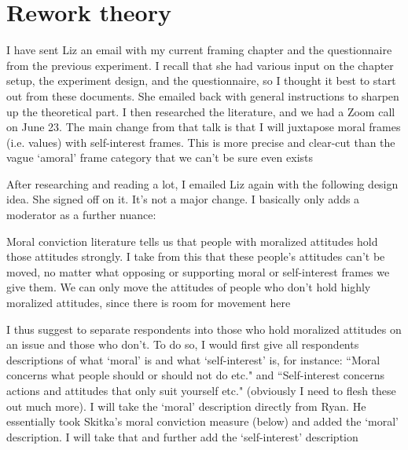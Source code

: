 \section*{Rework theory}
	\begin{coi}
		\item I have sent Liz an email with my current framing chapter and the questionnaire from the previous experiment. I recall that she had various input on the chapter setup, the experiment design, and the questionnaire, so I thought it best to start out from these documents. She emailed back with general instructions to sharpen up the theoretical part. I then researched the literature, and we had a Zoom call on June 23. The main change from that talk is that I will juxtapose moral frames (i.e. values) with self-interest frames. This is more precise and clear-cut than the vague `amoral' frame category that we can't be sure even exists
		\item After researching and reading a lot, I emailed Liz again with the following design idea. She signed off on it. It's not a major change. I basically only adds a moderator as a further nuance:
			\begin{coi}
				\item Moral conviction literature tells us that people with moralized attitudes hold those attitudes strongly. I take from this that these people's attitudes can't be moved, no matter what opposing or supporting moral or self-interest frames we give them. We can only move the attitudes of people who don't hold highly moralized attitudes, since there is room for movement here
				\item I thus suggest to separate respondents into those who hold moralized attitudes on an issue and those who don't. To do so, I would first give all respondents descriptions of what `moral' is and what `self-interest' is, for instance: ``Moral concerns what people should or should not do etc." and ``Self-interest concerns actions and attitudes that only suit yourself etc." (obviously I need to flesh these out much more). I will take the `moral' description directly from Ryan. He essentially took Skitka's moral conviction measure (below) and added the `moral' description. I will take that and further add the `self-interest' description

\end{coi}
\end{coi}
